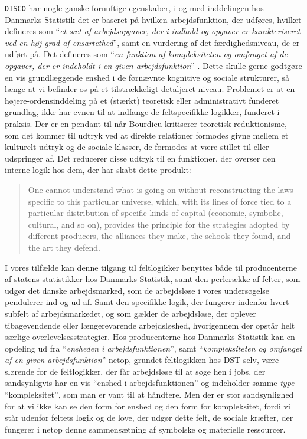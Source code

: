 \texttt{DISCO} har nogle ganske fornuftige egenskaber, i og med inddelingen hos Danmarks Statistik det er baseret på hvilken arbejdsfunktion, der udføres, hvilket defineres som “\emph{et sæt af arbejdsopgaver, der i indhold og opgaver er karakteriseret ved en høj grad af ensartethed}”, samt en vurdering af det færdighedsniveau, de er udført på. Det defineres som “\emph{en funktion af kompleksiteten og omfanget af de opgaver, der er indeholdt i en given arbejdsfunktion}” \parencite[7]{Ploug2011}. Dette skulle gerne godtgøre en vis grundlæggende enshed i de førnævnte kognitive og sociale strukturer, så længe at vi befinder os på et tilstrækkeligt detaljeret niveau. Problemet er at en højere-ordensinddeling på et (stærkt) teoretisk eller administrativt funderet grundlag, ikke har evnen til at indfange de feltspecifikke logikker, funderet i praksis. Der er en pendant til når Bourdieu kritiserer  teoretisk reduktionisme, som det kommer til udtryk ved at direkte relationer formodes givne mellem et kulturelt udtryk og de sociale klasser, de formodes at være stillet til eller udspringer af. Det reducerer disse udtryk til en funktioner, der overser den interne logik hos dem, der har skabt dette produkt:
%
\begin{quote} \small %
One cannot understand what is going on without reconstructing the laws specific to this particular universe, which, with its lines of force tied to a particular distribution of specific kinds of capital (economic, symbolic, cultural, and so on), provides the principle for the strategies adopted by different producers, the alliances they make, the schools they found, and the art they defend. 
\end{quote}
%
I vores tilfælde kan denne tilgang til feltlogikker benyttes både til producenterne af statens statistikker hos Danmarks Statistik, samt den perlerække af felter, som udgør det danske arbejdsmarked, som de arbejdsløse i vores undersøgelse pendulerer ind og ud af. Samt den specifikke logik, der fungerer indenfor hvert subfelt af arbejdsmarkedet, og som gælder de arbejdsløse, der oplever tibagevendende eller længerevarende arbejdsløshed, hvorigennem der opstår helt særlige overlevelsesstrategier. Hos producenterne hos Danmarks Statistik kan en opdeling ud fra “\emph{ensheden i arbejdsfunktionen}”, samt “\emph{kompleksiteten og omfanget af en given arbejdsfunktion}” netop, grundet feltlogikken hos DST selv, være slørende for de feltlogikker, der får arbejdsløse til at søge hen i jobs, der sandsynligvis har en vis “enshed i arbejdsfunktionen” og indeholder samme \emph{type} “kompleksitet”, som man er vant til at håndtere. Men der er stor sandsynlighed for at vi ikke kan se den form for enshed og den form for kompleksitet, fordi vi står udenfor feltets logik og de love, der udgør dette felt, de sociale kræfter, der fungerer i netop denne sammensætning af symbolske og materielle ressourcer. 

